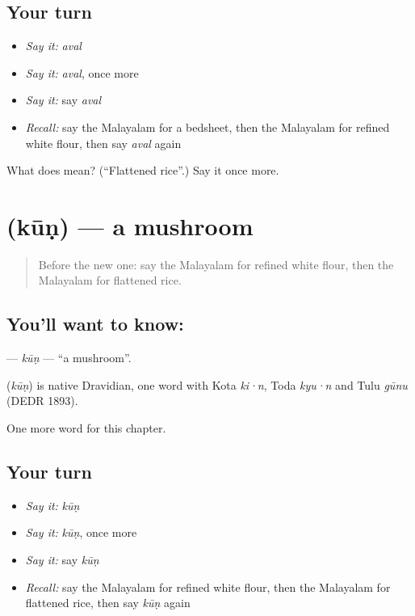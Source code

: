 \subsection*{Your turn}
\begin{itemize}
\raggedright
  \item \emph{Say it:} \emph{aval}
  \item \emph{Say it:} \emph{aval}, once more
  \item \emph{Say it:} say \emph{aval}
  \item \emph{Recall:} say the Malayalam for a bedsheet, then the Malayalam for refined white flour, then say \emph{aval} again
\end{itemize}

\begin{tcolorbox}[breakable,colback=teal!4,colframe=teal!35!black,title={Before you move on}]
What does  mean? (\textquotedblleft{}Flattened rice\textquotedblright{}.) Say it once more.
\end{tcolorbox}
\section[\texorpdfstring{\ml{കൂൺ} (kūṇ)}{കൂൺ (kūṇ)}]{ (kūṇ) — a mushroom}

\label{lesson:ML-C297-kun}



\begin{quote}
Before the new one: say the Malayalam for refined white flour, then the Malayalam for flattened rice.
\end{quote}

\subsection*{You'll want to know: }
\textbf{} — \emph{kūṇ} — \textquotedblleft{}a mushroom\textquotedblright{}.

\begin{cousinweb}
\textbf{} (\emph{kūṇ}) is native Dravidian, one word with Kota \emph{ki·n}, Toda \emph{kyu·n} and Tulu \emph{gūnu} (DEDR 1893).
\end{cousinweb}

\begin{grammarlens}[title={What you've built}]
One more word for this chapter.
\end{grammarlens}

\subsection*{Your turn}
\begin{itemize}
\raggedright
  \item \emph{Say it:} \emph{kūṇ}
  \item \emph{Say it:} \emph{kūṇ}, once more
  \item \emph{Say it:} say \emph{kūṇ}
  \item \emph{Recall:} say the Malayalam for refined white flour, then the Malayalam for flattened rice, then say \emph{kūṇ} again
\end{itemize}

